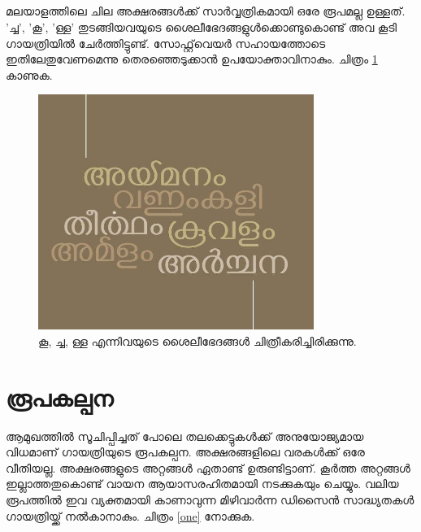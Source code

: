 \documentclass[12pt]{report}
\begin{document}
	\paragraph{}
	മലയാളത്തിലെ ചില അക്ഷരങ്ങള്‍ക്ക് സാര്‍വ്വത്രികമായി ഒരേ രൂപമല്ല ഉള്ളത്. 'ച്ച', 'കൂ', 'ള്ള' തുടങ്ങിയവയുടെ ശൈലീഭേദങ്ങളുള്‍ക്കൊണ്ടുകൊണ്ട് അവ കൂടി ഗായത്രിയിൽ ചേര്‍ത്തിട്ടുണ്ട്. സോഫ്റ്റ്‌വെയര്‍ സഹായത്തോടെ ഇതിലേതുവേണമെന്നു തെരഞ്ഞെടുക്കാന്‍ ഉപയോക്താവിനാകും. ചിത്രം \ref{style} കാണുക. 
	‍ 
	\begin{figure}
		\begin{centering}
			\includegraphics[width=0.8\textwidth]{style.jpg}
			\caption{കൂ, ച്ച, ള്ള എന്നിവയുടെ ശൈലീഭേദങ്ങൾ ചിത്രീകരിച്ചിരിക്കുന്നു.}
			\label{style}
		\end{centering}
	\end{figure}
	
	
	\chapter*{രൂപകല്പന}
	
	ആമുഖത്തില്‍ സൂചിപ്പിച്ചത് പോലെ തലക്കെട്ടുകള്‍ക്ക് അനുയോജ്യമായ വിധമാണ് ഗായത്രിയുടെ രൂപകല്പന‍. അക്ഷരങ്ങളിലെ വരകൾക്ക് ഒരേ വീതിയല്ല. അക്ഷരങ്ങളുടെ അറ്റങ്ങള്‍ ഏതാണ്ട് ഉരുണ്ടിട്ടാണ്. കൂർത്ത അറ്റങ്ങൾ ഇല്ലാത്തതുകൊണ്ട് വായന ആയാസരഹിതമായി നടക്കുകയും ചെയ്യും.  വലിയ രൂപത്തില്‍ ഇവ വ്യക്തമായി കാണാവുന്ന മിഴിവാര്‍ന്ന ഡിസൈന്‍ സാദ്ധ്യതകള്‍ ഗായത്രിയ്ക്ക് നല്‍കാനാകും.  ചിത്രം \ref{one} നോക്കുക.
	
\end{document}
